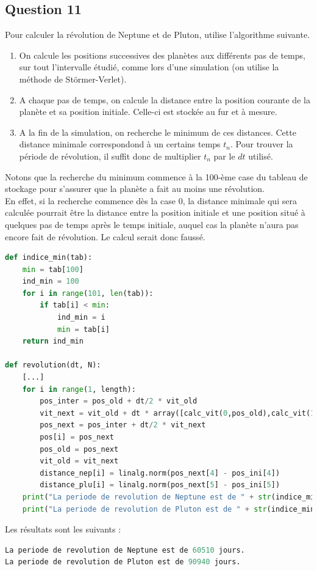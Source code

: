 \documentclass{article}
\begin{document}
\subsection*{Question 11}
Pour calculer la révolution de Neptune et de Pluton, utilise l'algorithme suivante.
\begin{enumerate}
\item On calcule les positions successives des planètes aux différents pas de temps, sur tout l'intervalle étudié, comme lors d'une simulation (on utilise la méthode de Störmer-Verlet).
\item A chaque pas de temps, on calcule la distance entre la position courante de la planète et sa position initiale. Celle-ci est stockée au fur et à mesure.
\item A la fin de la simulation, on recherche le minimum de ces distances. Cette distance minimale correspondond à un certains temps $t_n$. Pour trouver la période de révolution, il suffit donc de multiplier $t_n$ par le $dt$ utilisé.
\end{enumerate}
Notons que la recherche du minimum commence à la 100-ème case du tableau de stockage pour s'assurer que la planète a fait au moins une révolution.\\
En effet, si la recherche commence dès la case 0, la distance minimale qui sera calculée pourrait être la distance entre la position initiale et une position situé à quelques pas de temps après le temps initiale, auquel cas la planète n'aura pas encore fait de révolution. Le calcul serait donc faussé.
\begin{lstlisting}[language=Python]
def indice_min(tab):
    min = tab[100]
    ind_min = 100
    for i in range(101, len(tab)):
        if tab[i] < min:
            ind_min = i
            min = tab[i]
    return ind_min
    
def revolution(dt, N):
    [...]
    for i in range(1, length):
        pos_inter = pos_old + dt/2 * vit_old
        vit_next = vit_old + dt * array([calc_vit(0,pos_old),calc_vit(1,pos_old),calc_vit(2,pos_old),calc_vit(3,pos_old),calc_vit(4,pos_old),calc_vit(5,pos_old)])
        pos_next = pos_inter + dt/2 * vit_next
        pos[i] = pos_next
        pos_old = pos_next
        vit_old = vit_next
        distance_nep[i] = linalg.norm(pos_next[4] - pos_ini[4])
        distance_plu[i] = linalg.norm(pos_next[5] - pos_ini[5])
    print("La periode de revolution de Neptune est de " + str(indice_min(distance_nep) * dt) + " jours.")
    print("La periode de revolution de Pluton est de " + str(indice_min(distance_plu) * dt) + " jours.")
\end{lstlisting}
Les résultats sont les suivants :
\begin{lstlisting}[language=Python]
La periode de revolution de Neptune est de 60510 jours.
La periode de revolution de Pluton est de 90940 jours.
\end{lstlisting}
\end{document}
